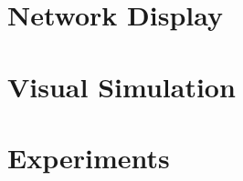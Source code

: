\documentclass[oneside]{ausarbeitung}
\begin{document}
\chapter{Network Display}
\label{cha:network_display}


\chapter{Visual Simulation}
\label{cha:visual_simulation}


\chapter{Experiments}
\label{cha:experiments}


% 

% 

% 

% 

% 

% 

\appendix

\printbibliography[heading=bibintoc]
\end{document}
